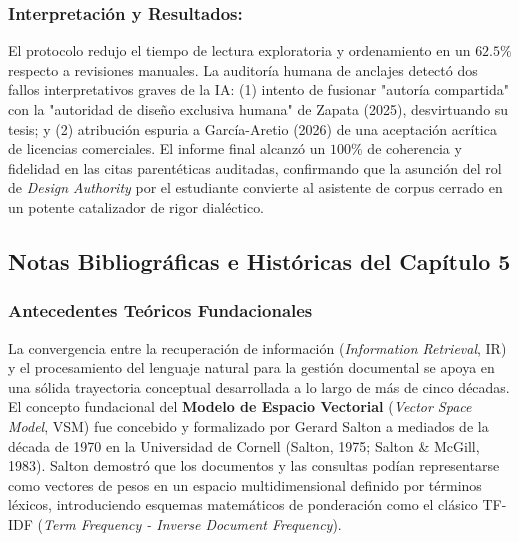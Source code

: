 \subsubsection*{Interpretación y Resultados:}
El protocolo redujo el tiempo de lectura exploratoria y ordenamiento en un $62.5\%$ respecto a revisiones manuales. La auditoría humana de anclajes detectó dos fallos interpretativos graves de la IA: (1) intento de fusionar "autoría compartida" con la "autoridad de diseño exclusiva humana" de Zapata (2025), desvirtuando su tesis; y (2) atribución espuria a García-Aretio (2026) de una aceptación acrítica de licencias comerciales. El informe final alcanzó un $100\%$ de coherencia y fidelidad en las citas parentéticas auditadas, confirmando que la asunción del rol de \textit{Design Authority} por el estudiante convierte al asistente de corpus cerrado en un potente catalizador de rigor dialéctico.

\newpage
{}

\subsection*{Notas Bibliográficas e Históricas del Capítulo 5}

\subsubsection*{Antecedentes Teóricos Fundacionales}

La convergencia entre la recuperación de información (\textit{Information Retrieval}, IR) y el procesamiento del lenguaje natural para la gestión documental se apoya en una sólida trayectoria conceptual desarrollada a lo largo de más de cinco décadas. El concepto fundacional del \textbf{Modelo de Espacio Vectorial} (\textit{Vector Space Model}, VSM) fue concebido y formalizado por Gerard Salton a mediados de la década de 1970 en la Universidad de Cornell (Salton, 1975; Salton \& McGill, 1983). Salton demostró que los documentos y las consultas podían representarse como vectores de pesos en un espacio multidimensional definido por términos léxicos, introduciendo esquemas matemáticos de ponderación como el clásico TF-IDF (\textit{Term Frequency - Inverse Document Frequency}).

